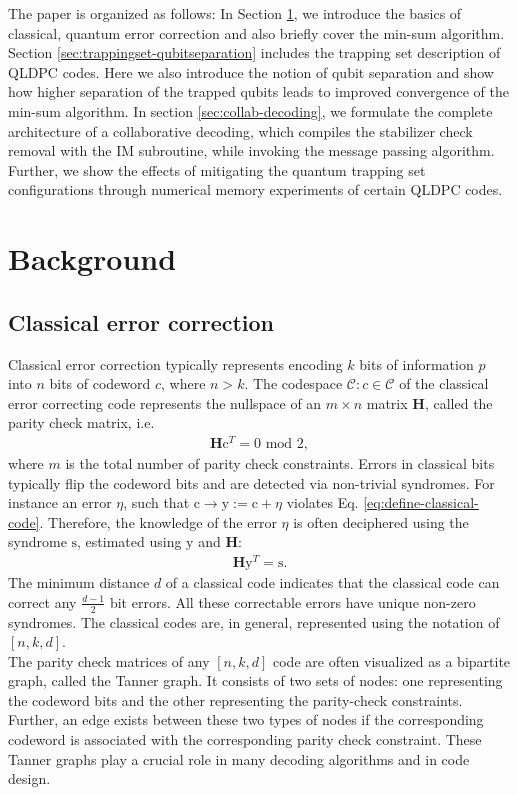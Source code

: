 \documentclass[%
 reprint,
 amsmath,amssymb,
 aps,
pra,
showkeys,
]{revtex4-2}
\begin{document}
The paper is organized as follows: In Section \ref{sec:prelims}, we introduce the basics of classical, quantum error correction and also briefly cover the min-sum algorithm.
Section \ref{sec:trappingset-qubitseparation} includes the trapping set description of QLDPC codes.
Here we also introduce the notion of qubit separation and show how higher separation of the trapped qubits leads to improved convergence of the min-sum algorithm.
In section \ref{sec:collab-decoding}, we formulate the complete architecture of a collaborative decoding, which compiles the stabilizer check removal with the IM subroutine, while invoking the message passing algorithm.
Further, we show the effects of mitigating the quantum trapping set configurations through numerical memory experiments of certain QLDPC codes.

\section{Background}
\label{sec:prelims}
\subsection{Classical error correction}
Classical error correction typically represents encoding $k$ bits of information $p$ into $n$ bits of codeword $c$, where $n > k$.
The codespace $\mathcal{C}: c \in \mathcal{C}$ of the classical error correcting code represents the nullspace of an $m \times n$ matrix $\mathbf{H}$, called the parity check matrix, i.e.
\begin{align}
\label{eq:define-classical-code}
    \mathbf{H}\mathrm{c}^T = 0 \,\,\text{mod}\,\, 2,
\end{align}
where $m$ is the total number of parity check constraints.
Errors in classical bits typically flip the codeword bits and are detected via non-trivial syndromes.
For instance an error $\eta$, such that $\mathrm{c} \rightarrow \mathrm{y}:= \mathrm{c} + \eta$ violates Eq. \eqref{eq:define-classical-code}.
Therefore, the knowledge of the error $\eta$ is often deciphered using the syndrome $\mathrm{s}$, estimated using $\mathrm{y}$ and $\mathbf{H}$:
\begin{align}
\label{eq:syndrome-defn}
    \mathbf{H}\mathrm{y}^T = \mathrm{s}. 
\end{align}
The minimum distance $d$ of a classical code indicates that the classical code can correct any $\frac{d-1}{2}$ bit errors.
All these correctable errors have unique non-zero syndromes.
The classical codes are, in general, represented using the notation of $[n,k,d]$.
\\
The parity check matrices of any $[n,k,d]$ code are often visualized as a bipartite graph, called the Tanner graph.
It consists of two sets of nodes: one representing the codeword bits and the other representing the parity-check constraints.
Further, an edge exists between these two types of nodes if the corresponding codeword is associated with the corresponding parity check constraint.
These Tanner graphs play a crucial role in many decoding algorithms and in code design.
\end{document}
